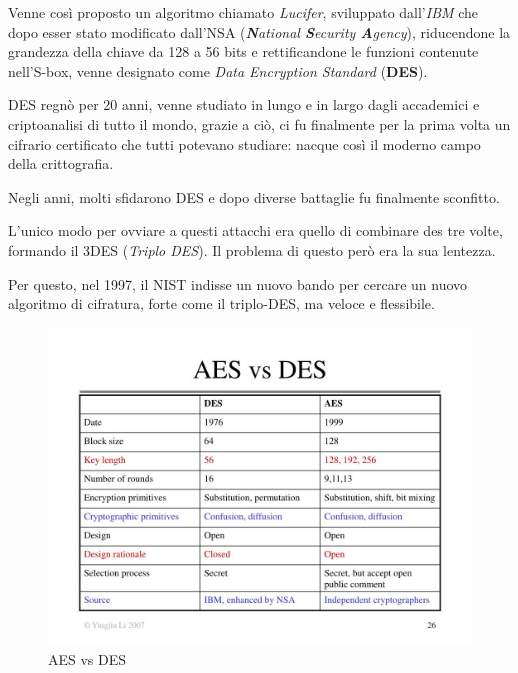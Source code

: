\textsf{\small Venne così proposto un algoritmo chiamato \emph{Lucifer}, sviluppato dall'\emph{IBM} che dopo esser stato modificato dall'NSA (\emph{\textbf{N}ational \textbf{S}ecurity \textbf{A}gency}), riducendone la grandezza della chiave da 128 a 56 bits e rettificandone le funzioni contenute nell'S-box, venne designato come \emph{Data Encryption Standard} (\textbf{DES}).}

\textsf{\small DES regnò per 20 anni, venne studiato in lungo e in largo dagli accademici e criptoanalisi di tutto il mondo, grazie a ciò, ci fu finalmente per la prima volta un cifrario certificato che tutti potevano studiare: nacque così il moderno campo della crittografia.}

\textsf{\small Negli anni, molti sfidarono DES e dopo diverse battaglie fu finalmente sconfitto.} %

\textsf{\small L'unico modo per ovviare a questi attacchi era quello di combinare des tre volte, formando il 3DES (\emph{Triplo DES}). Il problema di questo però era la sua lentezza.} %


\textsf{\small Per questo, nel 1997, il NIST indisse un nuovo bando per cercare un nuovo algoritmo di cifratura, forte come il triplo-DES, ma veloce e flessibile.}

\begin{figure}[H]
	\centering
	\includegraphics[width=1\textwidth, height=1\textheight, keepaspectratio]{./images/des_vs_aes/aes-vs-des.png}
	\caption{AES vs DES}
	\label{fig:aes_vs_des}
\end{figure}

